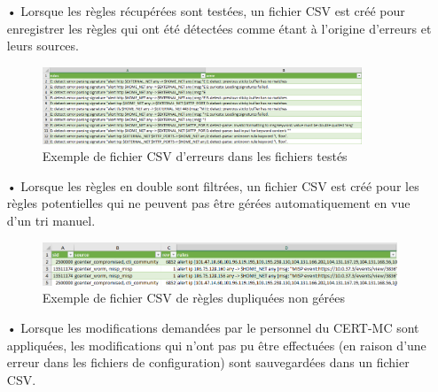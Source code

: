 \begin{itemize}[itemsep=2em]
    \item[•] Lorsque les règles récupérées sont testées, un fichier CSV est créé pour enregistrer les règles qui ont été détectées comme étant à l'origine d'erreurs et leurs sources.

\vspace{1em}

    \begin{figure}[h]%
        \center%
        \includegraphics[width=0.9\textwidth]{assets/SuricataError.png}
        \caption[Exemple de fichier CSV d'erreurs dans les fichiers testés]{Exemple de fichier CSV d'erreurs dans les fichiers testés}\label{fig:SuricataError}
    \end{figure}

\newpage

    \item[•] Lorsque les règles en double sont filtrées, un fichier CSV est créé pour les règles potentielles qui ne peuvent pas être gérées automatiquement en vue d'un tri manuel.

\vspace{1em}

    \begin{figure}[h]%
        \center%
        \includegraphics[width=1\textwidth]{assets/RuleColision.png}
        \caption[Exemple de fichier CSV de règles dupliquées non géré]{Exemple de fichier CSV de règles dupliquées non gérées}\label{fig:RuleColision}
    \end{figure}

    \item[•] Lorsque les modifications demandées par le personnel du CERT-MC sont appliquées, les modifications qui n'ont pas pu être effectuées (en raison d'une erreur dans les fichiers de configuration) sont sauvegardées dans un fichier CSV.\\

\vspace{1em}


\end{itemize}
